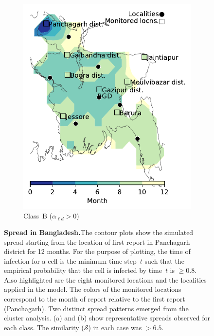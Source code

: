\documentclass[11pt]{article}
\newcommand{\similarity}{\mathcal{S}}
\newcommand{\ald}{\alpha_{\ell d}}
\theoremstyle{definition}
\begin{document}
\begin{figure}[!ht]
\begin{subfigure}[b]{.4\textwidth}
    \includegraphics[width=\textwidth]{../cellular_automata/results/contour/BGD_model-B_m1_l3.pdf}
    \caption{Class~B ($\ald>0$) \label{fig:bgdClassB1}}
\end{subfigure}
\caption{\textbf{Spread in Bangladesh.}The contour plots show the simulated
spread starting from the location of first report in Panchagarh district
for 12 months. For the purpose of plotting, the time of infection for a
cell is the minimum time step~$t$ such that the empirical probability that
the cell is infected by time~$t$ is $\ge0.8$. Also highlighted are the
eight monitored locations and the localities applied in the model. The
colors of the monitored locations correspond to the month of report
relative to the first report (Panchagarh). Two distinct spread patterns
emerged from the cluster analysis. (a) and (b) show representative spreads
observed for each class. The similarity ($\similarity$) in each case was
$>6.5$.}
\end{figure}
\end{document}
